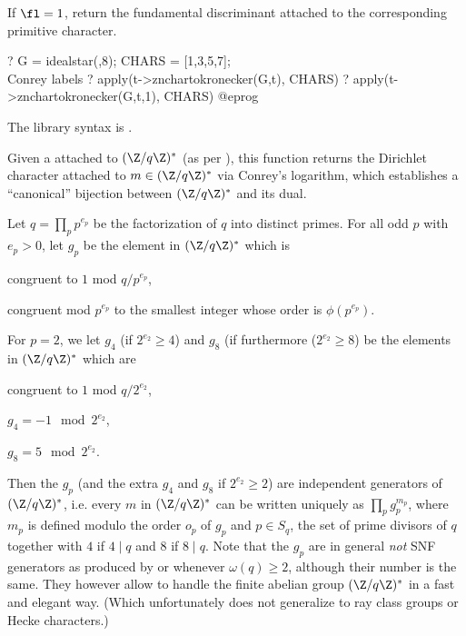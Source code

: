 If $\fl = 1$, return the fundamental discriminant attached to the
corresponding primitive character.

\bprog
? G = idealstar(,8); CHARS = [1,3,5,7]; \\ Conrey labels
? apply(t->znchartokronecker(G,t), CHARS)
? apply(t->znchartokronecker(G,t,1), CHARS)
@eprog

The library syntax is .

\label{se:znconreychar}
Given a  attached to $(\Z/q\Z)^*$ (as per
), this function returns the Dirichlet character
attached to $m \in (\Z/q\Z)^*$ via Conrey's logarithm, which
establishes a ``canonical'' bijection between $(\Z/q\Z)^*$ and its dual.

Let $q = \prod_p p^{e_p}$ be the factorization of $q$ into distinct primes.
For all odd  $p$ with $e_p > 0$, let $g_p$ be the element in $(\Z/q\Z)^*$
which is

\item congruent to $1$ mod $q/p^{e_p}$,

\item congruent mod $p^{e_p}$ to the smallest integer whose order
is $\phi(p^{e_p})$.

For $p = 2$, we let $g_4$ (if $2^{e_2} \geq 4$) and $g_8$ (if furthermore
($2^{e_2} \geq 8$) be the elements in $(\Z/q\Z)^*$ which
are

\item congruent to $1$ mod $q/2^{e_2}$,

\item $g_4 = -1 \mod 2^{e_2}$,

\item $g_8 = 5 \mod 2^{e_2}$.

Then the $g_p$ (and the extra $g_4$ and $g_8$ if $2^{e_2}\geq 2$) are
independent
generators of $(\Z/q\Z)^*$, i.e. every $m$ in $(\Z/q\Z)^*$ can be written
uniquely as $\prod_p g_p^{m_p}$, where $m_p$ is defined modulo the order
$o_p$ of $g_p$
and $p \in S_q$, the set of prime divisors of $q$ together with $4$
if $4 \mid q$ and $8$ if $8 \mid q$. Note that the $g_p$ are in general
\emph{not} SNF
generators as produced by  or  whenever
$\omega(q) \geq 2$, although their number is the same. They however allow
to handle the finite abelian group $(\Z/q\Z)^*$ in a fast and elegant
way. (Which unfortunately does not generalize to ray class groups or Hecke
characters.)

